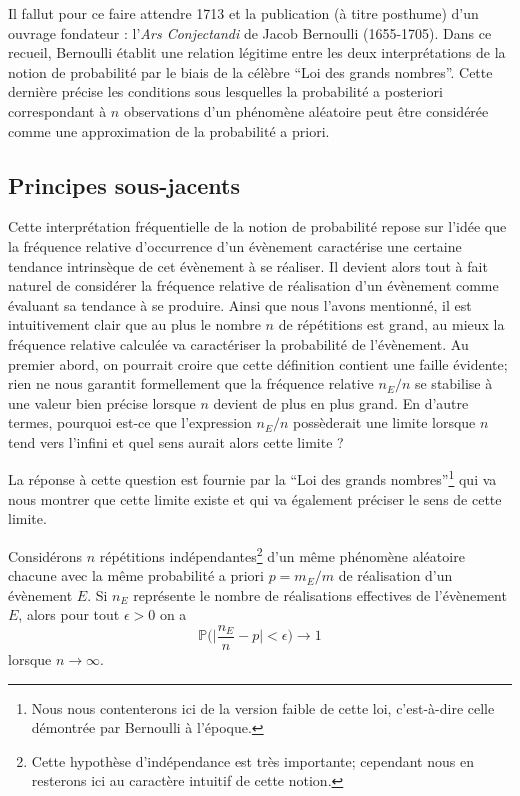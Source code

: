 \documentclass[11pt,a4paper]{article}
\begin{document}
Il fallut pour ce faire attendre 1713 et la publication (à titre posthume) d'un ouvrage fondateur : l'\textit{Ars Conjectandi} de Jacob Bernoulli (1655-1705). Dans ce recueil, Bernoulli établit une relation légitime entre les deux interprétations de la notion de probabilité par le biais de la célèbre ``Loi des grands nombres''. Cette dernière précise les conditions sous lesquelles la probabilité a posteriori correspondant à $n$ observations d'un phénomène aléatoire peut être considérée comme une approximation de la probabilité a priori.

\subsection{Principes sous-jacents}

Cette interprétation fréquentielle de la notion de probabilité repose sur l'idée que la fréquence relative d'occurrence d'un évènement caractérise une certaine tendance intrinsèque de cet évènement à se réaliser. Il devient alors tout à fait naturel de considérer la fréquence relative de réalisation d'un évènement comme évaluant sa tendance à se produire. Ainsi que nous l'avons mentionné, il est intuitivement clair que au plus le nombre $n$ de répétitions est grand, au mieux la fréquence relative calculée va caractériser la probabilité de l'évènement. Au premier abord, on pourrait croire que cette définition contient une faille évidente; rien ne nous garantit formellement que la fréquence relative $n_E/n$ se stabilise à une valeur bien précise lorsque $n$ devient de plus en plus grand. En d'autre termes, pourquoi est-ce que l'expression $n_E/n$ possèderait une limite lorsque $n$ tend vers l'infini et quel sens aurait alors cette limite ?

La réponse à cette question est fournie par la ``Loi des grands nombres''\footnote{Nous nous contenterons ici de la version faible de cette loi, c'est-à-dire celle démontrée par Bernoulli à l'époque.} qui va nous montrer que cette limite existe et qui va également préciser le sens de cette limite.

\begin{The}{Considérons $n$ répétitions indépendantes\footnote{Cette hypothèse d'indépendance est très importante; cependant nous en resterons ici au caractère intuitif de cette notion.} d'un même phénomène aléatoire chacune avec la même probabilité a priori $p = m_E/m$ de réalisation d'un évènement $E$. Si $n_E$ représente le nombre de réalisations effectives de l'évènement $E$, alors pour tout $\epsilon>0$ on a
\[\mathbb{P}\Biggl(\Biggl|\frac{n_E}{n} - p\Biggr|<\epsilon\Biggr)\rightarrow 1\]
lorsque $n\rightarrow\infty$.}
\end{The}
\end{document}
